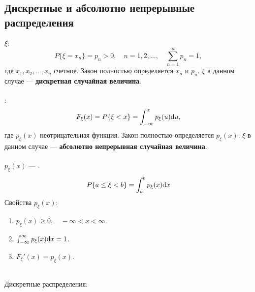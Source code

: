 \subsection{Дискретные и абсолютно непрерывные распределения}
 $\xi$:
\begin{equation*}
    P\{\xi = x_n\} = p_n > 0, \quad n = 1, 2, \ldots, \quad \sum_{n=1}^\infty p_n = 1,
\end{equation*}
где $x_1, x_2, \ldots, x_n$ счетное.
Закон полностью определяется $x_n$ и $p_n$.
$\xi$ в данном случае --- \textbf{дискретная случайная величина}.\\
\\
:
\begin{equation*}
    F_\xi(x) = P\{\xi < x\} = \int_{-\infty}^x p_\xi(u) \mathrm{d}{}u,
\end{equation*}
где $p_\xi(x)$ неотрицательная функция.
Закон полностью определяется $p_\xi(x)$.
$\xi$ в данном случае --- \textbf{абсолютно непрерывная случайная величина}.\\
\\
$p_\xi(x)$ --- .
\begin{equation*}
    P\{a \le \xi < b\} = \int_a^b p_\xi(x) \mathrm{d} x
\end{equation*}
Свойства $p_\xi(x)$:
\begin{enumerate}
    \item $p_\xi(x) \ge 0, \quad -\infty < x < \infty$.
    \item $\int_{-\infty}^\infty p_\xi(x) \mathrm{d} x = 1$.
    \item $F_\xi'(x) = p_\xi(x)$.
\end{enumerate}
\ \\
Дискретные распределения:
